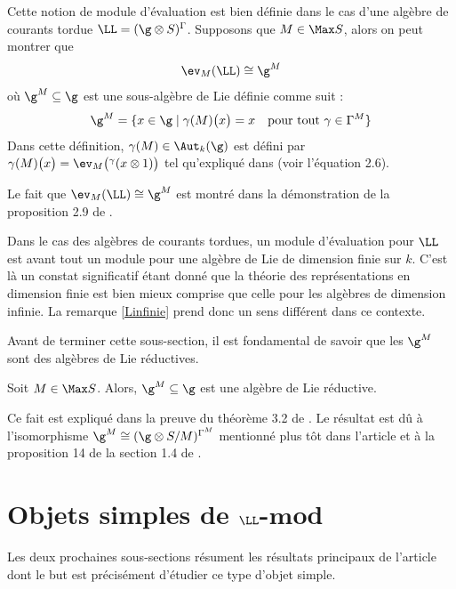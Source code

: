 Cette notion de module d'évaluation est bien définie dans le cas d'une algèbre de courants tordue $\LL = (\g \otimes S)^\Gamma$. Supposons que $M \in \Max S$, alors on peut montrer que
$$ \ev_M(\LL) \cong \g^M $$
où $\g^M \subseteq \g$ est une sous-algèbre de Lie définie comme suit :
\begin{equation} \label{definitiongm}
\g^M = \{x \in \g \; | \; \gamma(M)\big(x\big) = x \quad \text{pour tout } \gamma \in \Gamma^M\} 
\end{equation}
Dans cette définition, $\gamma(M) \in \Aut_k(\g)$ est défini par $ \gamma(M)\big(x\big) = \ev_M\big({}^\gamma(x \otimes 1)\big)$ tel qu'expliqué dans \cite{LauTCA} (voir l'équation 2.6).

\begin{Rem} Le fait que $\ev_M(\LL) \cong \g^M$ est montré dans la démonstration de la proposition 2.9 de \cite{LauTCA}.
\end{Rem}

\begin{Rem} Dans le cas des algèbres de courants tordues, un module d'évaluation pour $\LL$ est avant tout un module pour une algèbre de Lie de dimension finie sur $k$. C'est là un constat significatif étant donné que la théorie des représentations en dimension finie est bien mieux comprise que celle pour les algèbres de dimension infinie. La remarque \ref{Linfinie} prend donc un sens différent dans ce contexte.
\end{Rem}

Avant de terminer cette sous-section, il est fondamental de savoir que les $\g^M$ sont des algèbres de Lie réductives. 

\begin{Prop} \label{gmreductive} Soit $M \in \Max S$. Alors, $\g^M \subseteq \g$ est une algèbre de Lie réductive.
\end{Prop}

Ce fait est expliqué dans la preuve du théorème 3.2 de \cite{LauTCA}. Le résultat est dû à l'isomorphisme $\g^M \cong (\g \otimes S/M)^{\Gamma^M}$ mentionné plus tôt dans l'article et à la proposition 14 de la section 1.4 de \cite{Bourbakichap78}.  


\section{Objets simples de $\LL$-$\mathbf{mod}$}
Les deux prochaines sous-sections résument les résultats principaux de l'article \cite{LauTCA} dont le but est précisément d'étudier ce type d'objet simple.
%

